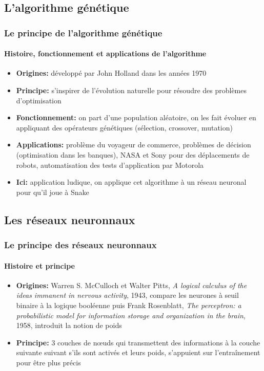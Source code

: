 \documentclass[10pt]{beamer}
\begin{document}
\subsection{L'algorithme génétique}

\begin{frame}
  \frametitle{Le principe de l'algorithme génétique}
  \framesubtitle{Histoire, fonctionnement et applications de l'algorithme}

  \begin{itemize}

    \item \textbf{Origines:} développé par John Holland dans les années 1970

    \item \textbf{Principe:} s'inspirer de l'évolution naturelle pour
    résoudre des problèmes d'optimisation

    \item \textbf{Fonctionnement:} on part d'une population aléatoire, on les fait évoluer en appliquant des opérateurs
    génétiques (sélection, crossover, mutation)

    \item \textbf{Applications:} problème du voyageur de commerce, problèmes de décision (optimisation dans les banques), NASA et Sony pour des déplacements de robots, automatisation des tests d'application par Motorola
    
    \item \textbf{Ici:} application ludique, on applique cet algorithme à un réseau neuronal pour qu'il joue à Snake
   

  \end{itemize}  
  \end{frame}

\subsection{Les réseaux neuronnaux}

\begin{frame}
  \frametitle{Le principe des réseaux neuronnaux}
  \framesubtitle{Histoire et principe}
  
  \begin{itemize}
    
    \item \textbf{Origines:} Warren S. McCulloch et Walter Pitts, \textit{A logical calculus of the ideas immanent in nervous activity}, 1943, compare les neurones à seuil binaire à la logique booléenne puis Frank Rosenblatt, \textit{The perceptron: a probabilistic model for information storage and organization in the brain}, 1958, introduit la notion de poids
    
    \item \textbf{Principe:} 3 couches de n\oe uds qui transmettent des informations à la couche suivante suivant s'ils sont activés et leurs poids, s'appuient sur l'entraînement pour être plus précis
    
    
  \end{itemize}

  \end{frame}
\end{document}

